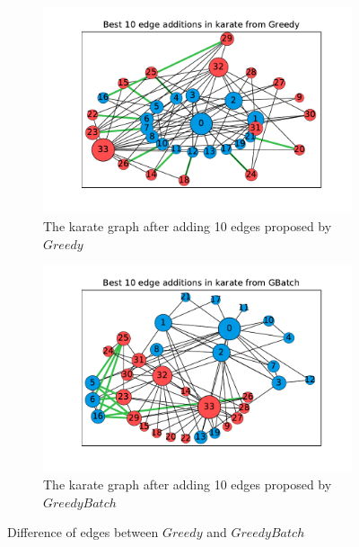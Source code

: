 \begin{figure}[!htbp]
	\centering
	\begin{subfigure}[t]{0.49\textwidth}
		\centering
		 \advance\leftskip-0.9cm
		 \captionsetup{justification=centering}
		\includegraphics[height=0.25\textheight]{Figures/karate_Greedy_edge_vis}
		\caption{The karate graph after adding 10 edges proposed by $Greedy$}
		\label{subfig:greedy}
	\end{subfigure}
	\hfill
	\begin{subfigure}[t]{0.49\textwidth}
		\centering
		\captionsetup{justification=centering}
		\includegraphics[height=0.25\textheight]{Figures/karate_GBatch_edge_vis}
		\caption{The karate graph after adding 10 edges proposed by $GreedyBatch$}
		\label{subfig:gbatch}
	\end{subfigure}
	\vspace{20pt}
	\hfill
	\caption{Difference of edges between $Greedy$ and $GreedyBatch$}
	\label{fig:top-10-karate}
\end{figure}

